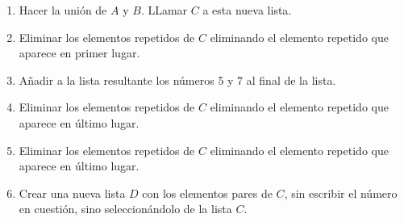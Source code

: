 \documentclass[11pt]{article}
\begin{document}
\begin{enumerate}
\def\labelenumi{\arabic{enumi}.}
\item
  Hacer la unión de \(A\) y \(B\). LLamar \(C\) a esta nueva lista.
\item
  Eliminar los elementos repetidos de \(C\) eliminando el elemento
  repetido que aparece en primer lugar.
\item
  Añadir a la lista resultante los números 5 y 7 al final de la lista.
\item
  Eliminar los elementos repetidos de \(C\) eliminando el elemento
  repetido que aparece en último lugar.
\item
  Eliminar los elementos repetidos de \(C\) eliminando el elemento
  repetido que aparece en último lugar.
\item
  Crear una nueva lista \(D\) con los elementos pares de \(C\), sin
  escribir el número en cuestión, sino seleccionándolo de la lista
  \(C\).
\end{enumerate}
\end{document}
